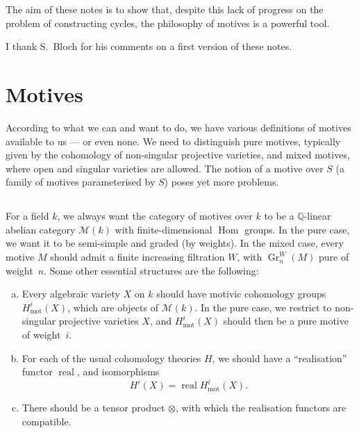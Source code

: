 \documentclass{article}
\theoremstyle{plain}
\theoremstyle{definition}
\newcommand{\scr}[1]{{\mathscr{#1}}}
\newcommand{\QQ}{\mathbb{Q}}
\newcommand{\mot}{\mathrm{mot}}
\DeclareMathOperator{\Hom}{Hom}
\DeclareMathOperator{\real}{real}
\DeclareMathOperator{\Gr}{Gr}
\newcommand{\oldpage}[1]{\marginpar{\footnotesize$\Big\vert$ \textit{p.~#1}}}
\begin{document}
\oldpage{145}
The aim of these notes is to show that, despite this lack of progress on the problem of constructing cycles, the philosophy of motives is a powerful tool.

I thank S.~Bloch for his comments on a first version of these notes.


\section{Motives}
\label{1}

According to what we can and want to do, we have various definitions of motives available to us --- or even none.
We need to distinguish pure motives, typically given by the cohomology of non-singular projective varieties, and mixed motives, where open and singular varieties are allowed.
The notion of a motive over $S$ (a family of motives parameterised by $S$) poses yet more problems.

\subsection{}
\label{1.1}

For a field $k$, we always want the category of motives over $k$ to be a $\QQ$-linear abelian category $\scr{M}(k)$ with finite-dimensional $\Hom$ groups.
In the pure case, we want it to be semi-simple and graded (by weights).
In the mixed case, every motive $M$ should admit a finite increasing filtration $W$, with $\Gr_n^W(M)$ pure of weight~$n$.
Some other essential structures are the following:
\begin{enumerate}[(a)]
  \item Every algebraic variety $X$ on $k$ should have motivic cohomology groups $H_\mot^i(X)$, which are objects of $\scr{M}(k)$.
    In the pure case, we restrict to non-singular projective varieties $X$, and $H_\mot^i(X)$ should then be a pure motive of weight~$i$.
  \item For each of the usual cohomology theories $H$, we should have a ``realisation'' functor $\real$, and isomorphisms
    \[
      H^i(X) = \real H_\mot^i(X).
    \]
  \item There should be a tensor product $\otimes$, with which the realisation functors are compatible.
\end{enumerate}

\subsection{}
\label{1.2}
\end{document}
